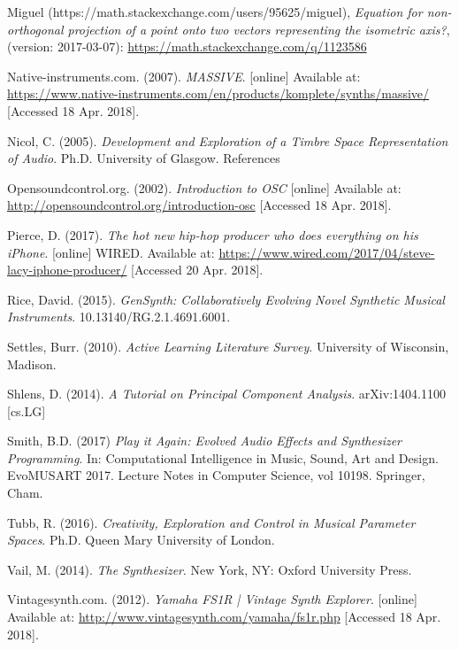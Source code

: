 \documentclass[11pt, oneside]{report}   	%
\begin{document}
{\begin{thebibliography}{9}
Miguel (https://math.stackexchange.com/users/95625/miguel), \emph{Equation for non-orthogonal projection of a point onto two vectors representing the isometric axis?}, (version: 2017-03-07): \url{https://math.stackexchange.com/q/1123586}

Native-instruments.com. (2007). \emph{MASSIVE}. [online] Available at: \url{https://www.native-instruments.com/en/products/komplete/synths/massive/} [Accessed 18 Apr. 2018].

Nicol, C. (2005). \emph{Development and Exploration of a Timbre Space Representation of Audio}. Ph.D. University of Glasgow.
References

Opensoundcontrol.org. (2002). \emph{Introduction to OSC} [online] Available at: \url{http://opensoundcontrol.org/introduction-osc} [Accessed 18 Apr. 2018].

Pierce, D. (2017). \emph{The hot new hip-hop producer who does everything on his iPhone}. [online] WIRED. Available at: \url{https://www.wired.com/2017/04/steve-lacy-iphone-producer/} [Accessed 20 Apr. 2018].

Rice, David. (2015). \emph{GenSynth: Collaboratively Evolving Novel Synthetic Musical Instruments}. 10.13140/RG.2.1.4691.6001. 

Settles, Burr. (2010). \emph{Active Learning Literature Survey}. University of Wisconsin, Madison.

Shlens, D. (2014). \emph{A Tutorial on Principal Component Analysis}. arXiv:1404.1100 [cs.LG]


Smith, B.D. (2017) \emph{Play it Again: Evolved Audio Effects and Synthesizer Programming}. In: Computational Intelligence in Music, Sound, Art and Design. EvoMUSART 2017. Lecture Notes in Computer Science, vol 10198. Springer, Cham.

Tubb, R. (2016). \emph{Creativity, Exploration and Control in Musical Parameter Spaces}. Ph.D. Queen Mary University of London.

Vail, M. (2014). \emph{The Synthesizer}. New York, NY: Oxford University Press.

Vintagesynth.com. (2012). \emph{Yamaha FS1R | Vintage Synth Explorer}. [online] Available at: \url{http://www.vintagesynth.com/yamaha/fs1r.php} [Accessed 18 Apr. 2018].


\end{thebibliography}}
\end{document}
